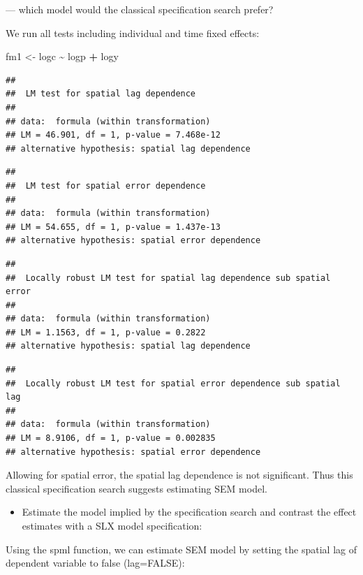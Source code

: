 \documentclass[
  a4paper,
]{article}
\newenvironment{Shaded}{\begin{snugshade}}{\end{snugshade}}
\newcommand{\NormalTok}[1]{#1}
\newcommand{\OtherTok}[1]{\textcolor[rgb]{0.56,0.35,0.01}{#1}}
\newcommand{\SpecialCharTok}[1]{\textcolor[rgb]{0.81,0.36,0.00}{\textbf{#1}}}
\providecommand{\tightlist}{%
  \setlength{\itemsep}{0pt}\setlength{\parskip}{0pt}}
\begin{document}
--- which model would the classical specification search prefer?

We run all tests including individual and time fixed effects:

\begin{Shaded}
\begin{Highlighting}[]
\NormalTok{fm1 }\OtherTok{\textless{}{-}}\NormalTok{ logc }\SpecialCharTok{\textasciitilde{}}\NormalTok{ logp }\SpecialCharTok{+}\NormalTok{ logy}
\end{Highlighting}
\end{Shaded}

\begin{verbatim}
## 
##  LM test for spatial lag dependence
## 
## data:  formula (within transformation)
## LM = 46.901, df = 1, p-value = 7.468e-12
## alternative hypothesis: spatial lag dependence
\end{verbatim}

\begin{verbatim}
## 
##  LM test for spatial error dependence
## 
## data:  formula (within transformation)
## LM = 54.655, df = 1, p-value = 1.437e-13
## alternative hypothesis: spatial error dependence
\end{verbatim}

\begin{verbatim}
## 
##  Locally robust LM test for spatial lag dependence sub spatial error
## 
## data:  formula (within transformation)
## LM = 1.1563, df = 1, p-value = 0.2822
## alternative hypothesis: spatial lag dependence
\end{verbatim}

\begin{verbatim}
## 
##  Locally robust LM test for spatial error dependence sub spatial lag
## 
## data:  formula (within transformation)
## LM = 8.9106, df = 1, p-value = 0.002835
## alternative hypothesis: spatial error dependence
\end{verbatim}

Allowing for spatial error, the spatial lag dependence is not
significant. Thus this classical specification search suggests
estimating SEM model.

\begin{itemize}
\tightlist
\item
  Estimate the model implied by the specification search and contrast
  the effect estimates with a SLX model specification:
\end{itemize}

Using the spml function, we can estimate SEM model by setting the
spatial lag of dependent variable to false (lag=FALSE):
\end{document}
